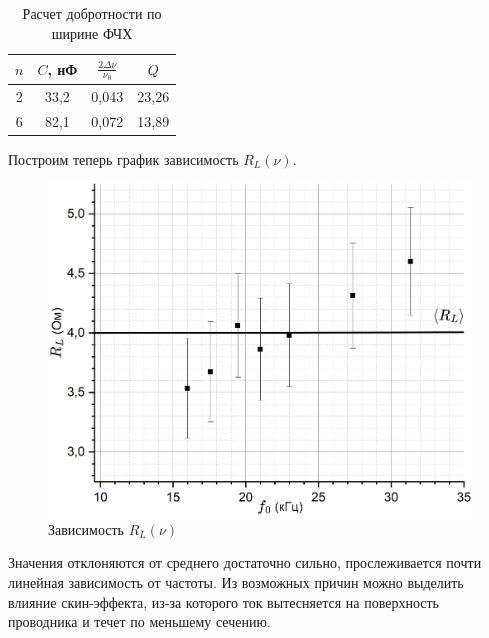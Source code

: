 \documentclass[a4paper, 12pt]{article}
\begin{document}
	\begin{table}[h]
		\centering
		\begin{tabular}{|c|c|c|c|}
			\hline
			$n$ & $C$, нФ & $\frac{2\Delta \nu}{\nu_0}$ & $Q$ \\ \hline
			2 & 33,2 & 0,043 & 23,26 \\ \hline
			6 & 82,1 & 0,072 & 13,89 \\ \hline
		\end{tabular}
		\caption{Расчет добротности по ширине ФЧХ}
	\end{table}
	
	Построим теперь график зависимость $R_L(\nu)$.
	
	\begin{figure}[h]
		\centering
		\includegraphics[width = \textwidth]{LinedR_L}
		\caption{Зависимость $R_L(\nu)$}
	\end{figure}
	
	Значения отклоняются от среднего достаточно сильно, прослеживается почти линейная зависимость от частоты. Из возможных причин можно выделить влияние скин-эффекта, из-за которого ток вытесняется на поверхность проводника и течет по меньшему сечению.
	\newpage
	
\end{document}
